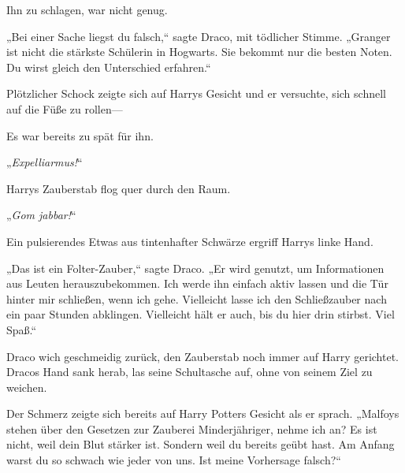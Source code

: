 Ihn zu schlagen, war nicht genug.

„Bei einer Sache liegst du falsch,“ sagte Draco, mit tödlicher Stimme. „Granger ist nicht die stärkste Schülerin in Hogwarts. Sie bekommt nur die besten Noten. Du wirst gleich den Unterschied erfahren.“

Plötzlicher Schock zeigte sich auf Harrys Gesicht und er versuchte, sich schnell auf die Füße zu rollen—

Es war bereits zu spät für ihn.

„\emph{Expelliarmus!}“

Harrys Zauberstab flog quer durch den Raum.

„\emph{Gom jabbar!}“

Ein pulsierendes Etwas aus tintenhafter Schwärze ergriff Harrys linke Hand.

„Das ist ein Folter-Zauber,“ sagte Draco. „Er wird genutzt, um Informationen aus Leuten herauszubekommen. Ich werde ihn einfach aktiv lassen und die Tür hinter mir schließen, wenn ich gehe. Vielleicht lasse ich den Schließzauber nach ein paar Stunden abklingen. Vielleicht hält er auch, bis du hier drin stirbst. Viel Spaß.“

Draco wich geschmeidig zurück, den Zauberstab noch immer auf Harry gerichtet. Dracos Hand sank herab, las seine Schultasche auf, ohne von seinem Ziel zu weichen.

Der Schmerz zeigte sich bereits auf Harry Potters Gesicht als er sprach. „Malfoys stehen über den Gesetzen zur Zauberei Minderjähriger, nehme ich an? Es ist nicht, weil dein Blut stärker ist. Sondern weil du bereits geübt hast. Am Anfang warst du so schwach wie jeder von uns. Ist meine Vorhersage falsch?“

